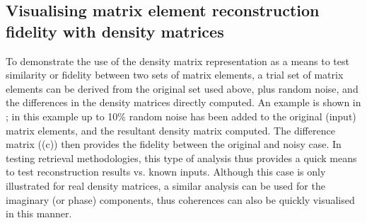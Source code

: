\documentclass[letterpaper,table,10pt,english]{jupyterBook}
\begin{document}
\subsection{Visualising matrix element reconstruction fidelity with density matrices}
\label{\detokenize{part1/theory_density_matrices_190723:visualising-matrix-element-reconstruction-fidelity-with-density-matrices}}
\sphinxAtStartPar
To demonstrate the use of the density matrix representation as a means to test similarity or fidelity between two sets of matrix elements, a trial set of matrix elements can be derived from the original set used above, plus random noise, and the differences in the density matrices directly computed. An example is shown in ; in this example up to 10\% random noise has been added to the original (input) matrix elements, and the resultant density matrix computed. The difference matrix ((c)) then provides the fidelity between the original and noisy case. In testing retrieval methodologies, this type of analysis thus provides a quick means to test reconstruction results vs. known inputs. Although this case is only illustrated for real density matrices, a similar analysis can be used for the imaginary (or phase) components, thus coherences can also be quickly visualised in this manner.
\end{document}
